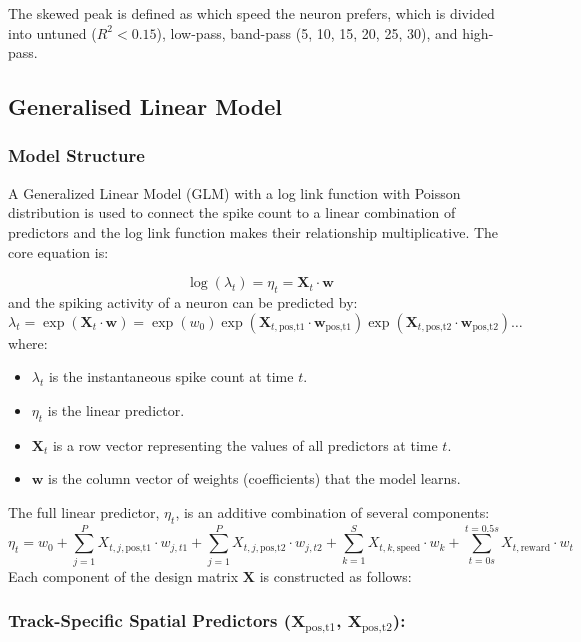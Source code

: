 The skewed peak is defined as which speed the neuron prefers, which is divided into untuned (\(R^2 < 0.15\)), low-pass, band-pass (5, 10, 15, 20, 25, 30), and high-pass.

\subsection{Generalised Linear Model}
\subsubsection{Model Structure}
A Generalized Linear Model (GLM) with a log link function with Poisson distribution is used to connect the spike count to a linear combination of predictors and the log link function makes their relationship multiplicative. The core equation is:

\begin{equation}
\log(\lambda_t) = \eta_t = \mathbf{X}_t \cdot \mathbf{w}
\end{equation}
and the spiking activity of a neuron can be predicted by:
\[\lambda_t = \exp(\mathbf{X}_t \cdot \mathbf{w}) = \exp(w_0) \exp(\mathbf{X}_{t, \text{pos,t1}} \cdot \mathbf{w}_{\text{pos,t1}}) \exp(\mathbf{X}_{t, \text{pos,t2}} \cdot \mathbf{w}_{\text{pos,t2}}) \dots
\]
where:
\begin{itemize}
    \item $\lambda_t$ is the instantaneous spike count at time $t$.
    \item $\eta_t$ is the linear predictor.
    \item $\mathbf{X}_t$ is a row vector representing the values of all predictors at time $t$.
    \item $\mathbf{w}$ is the column vector of weights (coefficients) that the model learns.
\end{itemize}

The full linear predictor, $\eta_t$, is an additive combination of several components:
\begin{equation}
\eta_t = w_0 + \sum_{j=1}^{P} X_{t,j,\text{pos,t1}} \cdot w_{j,t1} + \sum_{j=1}^{P} X_{t,j,\text{pos,t2}} \cdot w_{j,t2} + \sum_{k=1}^{S} X_{t,k,\text{speed}} \cdot w_{k} + \sum_{t=0 s}^{t=0.5 s}X_{t,\text{reward}} \cdot w_{t}
\end{equation}
Each component of the design matrix $\mathbf{X}$ is constructed as follows:


\subsubsection{\textbf{Track-Specific Spatial Predictors ($\mathbf{X}_{\text{pos,t1}}$, $\mathbf{X}_{\text{pos,t2}}$):}}

